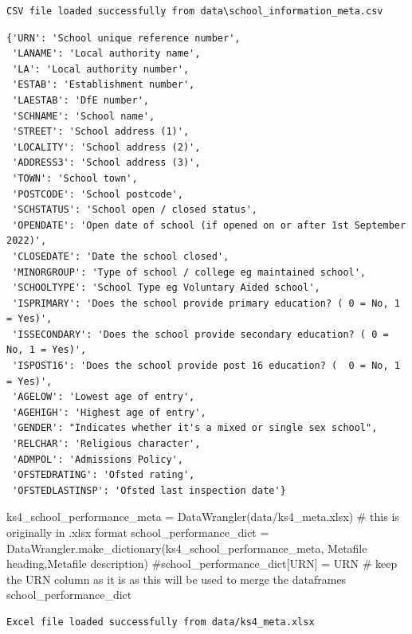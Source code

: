 \documentclass[
  letterpaper,
  DIV=11,
  numbers=noendperiod]{scrartcl}
\newenvironment{Shaded}{\begin{snugshade}}{\end{snugshade}}
\newcommand{\CommentTok}[1]{\textcolor[rgb]{0.37,0.37,0.37}{#1}}
\newcommand{\NormalTok}[1]{\textcolor[rgb]{0.00,0.23,0.31}{#1}}
\newcommand{\OperatorTok}[1]{\textcolor[rgb]{0.37,0.37,0.37}{#1}}
\newcommand{\StringTok}[1]{\textcolor[rgb]{0.13,0.47,0.30}{#1}}
\begin{document}
\begin{verbatim}
CSV file loaded successfully from data\school_information_meta.csv
\end{verbatim}

\begin{verbatim}
{'URN': 'School unique reference number',
 'LANAME': 'Local authority name',
 'LA': 'Local authority number',
 'ESTAB': 'Establishment number',
 'LAESTAB': 'DfE number',
 'SCHNAME': 'School name',
 'STREET': 'School address (1)',
 'LOCALITY': 'School address (2)',
 'ADDRESS3': 'School address (3)',
 'TOWN': 'School town',
 'POSTCODE': 'School postcode',
 'SCHSTATUS': 'School open / closed status',
 'OPENDATE': 'Open date of school (if opened on or after 1st September 2022)',
 'CLOSEDATE': 'Date the school closed',
 'MINORGROUP': 'Type of school / college eg maintained school',
 'SCHOOLTYPE': 'School Type eg Voluntary Aided school',
 'ISPRIMARY': 'Does the school provide primary education? ( 0 = No, 1 = Yes)',
 'ISSECONDARY': 'Does the school provide secondary education? ( 0 = No, 1 = Yes)',
 'ISPOST16': 'Does the school provide post 16 education? (  0 = No, 1 = Yes)',
 'AGELOW': 'Lowest age of entry',
 'AGEHIGH': 'Highest age of entry',
 'GENDER': "Indicates whether it's a mixed or single sex school",
 'RELCHAR': 'Religious character',
 'ADMPOL': 'Admissions Policy',
 'OFSTEDRATING': 'Ofsted rating',
 'OFSTEDLASTINSP': 'Ofsted last inspection date'}
\end{verbatim}

\begin{Shaded}
\begin{Highlighting}[]
\NormalTok{ks4\_school\_performance\_meta }\OperatorTok{=}\NormalTok{ DataWrangler(}\StringTok{\textquotesingle{}data/ks4\_meta.xlsx\textquotesingle{}}\NormalTok{) }\CommentTok{\# this is originally in .xlsx format}
\NormalTok{school\_performance\_dict }\OperatorTok{=}\NormalTok{ DataWrangler.make\_dictionary(ks4\_school\_performance\_meta, }\StringTok{\textquotesingle{}Metafile heading\textquotesingle{}}\NormalTok{,}\StringTok{\textquotesingle{}Metafile description\textquotesingle{}}\NormalTok{)}
\CommentTok{\#school\_performance\_dict[\textquotesingle{}URN\textquotesingle{}] = \textquotesingle{}URN\textquotesingle{}  \# keep the URN column as it is as this will be used to merge the dataframes}
\NormalTok{school\_performance\_dict}
\end{Highlighting}
\end{Shaded}

\begin{verbatim}
Excel file loaded successfully from data/ks4_meta.xlsx
\end{verbatim}
\end{document}
